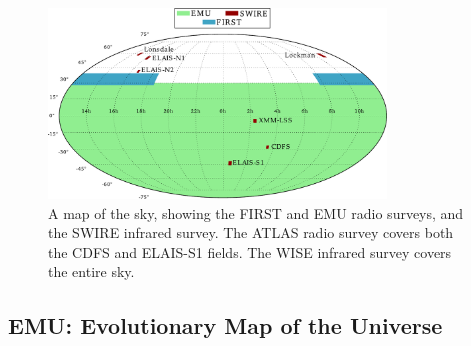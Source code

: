         \begin{figure}[!ht]
            \centering
            \includegraphics[width=0.8\textwidth]{images/skymap2.pdf}
            \caption{A map of the sky, showing the FIRST and EMU radio surveys,
                and the SWIRE infrared survey. The ATLAS radio survey
                covers both the CDFS and ELAIS-S1 fields. The WISE infrared
                survey covers the entire sky.}
        \end{figure}

        \subsection{EMU: Evolutionary Map of the Universe}
        \label{sec:emu}

